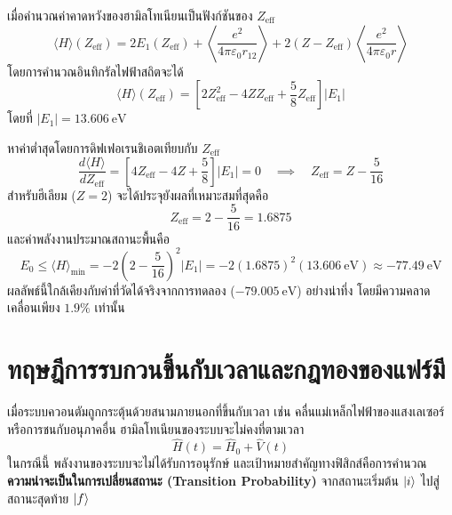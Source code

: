 เมื่อคำนวณค่าคาดหวังของฮามิลโทเนียนเป็นฟังก์ชันของ $Z_{\text{eff}}$
\begin{equation}
\langle H \rangle(Z_{\text{eff}}) = 2 E_1(Z_{\text{eff}}) + \left\langle \frac{e^2}{4\pi\varepsilon_0 r_{12}} \right\rangle + 2(Z - Z_{\text{eff}})\left\langle \frac{e^2}{4\pi\varepsilon_0 r} \right\rangle
\end{equation}
โดยการคำนวณอินทิกรัลไฟฟ้าสถิตจะได้
\begin{equation}
\langle H \rangle(Z_{\text{eff}}) = \left[ 2 Z_{\text{eff}}^2 - 4 Z Z_{\text{eff}} + \frac{5}{8} Z_{\text{eff}} \right] |E_1|
\end{equation}
โดยที่ $|E_1| = 13.606~\text{eV}$

หาค่าต่ำสุดโดยการดิฟเฟอเรนชิเอตเทียบกับ $Z_{\text{eff}}$
\begin{equation}
\frac{d\langle H \rangle}{dZ_{\text{eff}}} = \left[ 4 Z_{\text{eff}} - 4Z + \frac{5}{8} \right] |E_1| = 0 \quad \implies \quad Z_{\text{eff}} = Z - \frac{5}{16}
\end{equation}
สำหรับฮีเลียม ($Z = 2$) จะได้ประจุยังผลที่เหมาะสมที่สุดคือ
\begin{equation}
Z_{\text{eff}} = 2 - \frac{5}{16} = 1.6875
\end{equation}
และค่าพลังงานประมาณสถานะพื้นคือ
\begin{equation}
E_0 \le \langle H \rangle_{\text{min}} = -2\left( 2 - \frac{5}{16} \right)^2 |E_1| = -2(1.6875)^2 (13.606~\text{eV}) \approx -77.49~\text{eV}
\end{equation}
ผลลัพธ์นี้ใกล้เคียงกับค่าที่วัดได้จริงจากการทดลอง ($-79.005~\text{eV}$) อย่างน่าทึ่ง โดยมีความคลาดเคลื่อนเพียง $1.9\%$ เท่านั้น

\section{ทฤษฎีการรบกวนขึ้นกับเวลาและกฎทองของแฟร์มี}

เมื่อระบบควอนตัมถูกกระตุ้นด้วยสนามภายนอกที่ขึ้นกับเวลา เช่น คลื่นแม่เหล็กไฟฟ้าของแสงเลเซอร์ หรือการชนกับอนุภาคอื่น ฮามิลโทเนียนของระบบจะไม่คงที่ตามเวลา
\begin{equation}
\hat{H}(t) = \hat{H}_0 + \hat{V}(t)
\end{equation}
ในกรณีนี้ พลังงานของระบบจะไม่ได้รับการอนุรักษ์ และเป้าหมายสำคัญทางฟิสิกส์คือการคำนวณ \textbf{ความน่าจะเป็นในการเปลี่ยนสถานะ (Transition Probability)} จากสถานะเริ่มต้น $\ket{i}$ ไปสู่สถานะสุดท้าย $\ket{f}$

